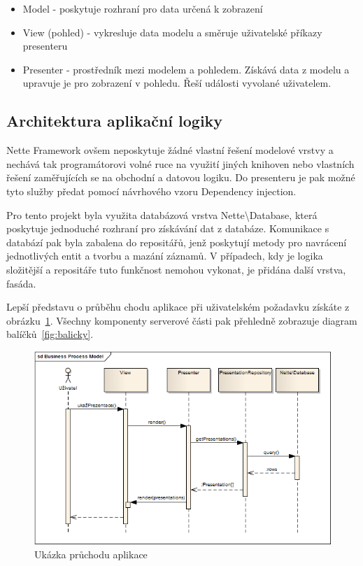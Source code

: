 \documentclass[11pt,twoside,a4paper]{book}
\begin{document}
\begin{itemize}
	\item Model - poskytuje rozhraní pro data určená k zobrazení
	\item View (pohled) - vykresluje data modelu a směruje uživatelské příkazy presenteru
	\item Presenter - prostředník mezi modelem a pohledem. Získává data z modelu a upravuje je pro zobrazení v pohledu. Řeší události vyvolané uživatelem.
\end{itemize}

\subsection{Architektura aplikační logiky}
Nette Framework ovšem neposkytuje žádné vlastní řešení modelové vrstvy a nechává tak programátorovi volné ruce na využití jiných knihoven nebo vlastních řešení zaměřujících se na obchodní a datovou logiku. Do presenteru je pak možné tyto služby předat pomocí návrhového vzoru Dependency injection\cite{di}.

Pro tento projekt byla využita databázová vrstva Nette\textbackslash{}Database, která poskytuje jednoduché rozhraní pro získávání dat z databáze. Komunikace s databází pak byla zabalena do repositářů, jenž poskytují metody pro navrácení jednotlivých entit a tvorbu a mazání záznamů. V případech, kdy je logika složitější a repositáře tuto funkčnost nemohou vykonat, je přidána další vrstva, fasáda. 

Lepší představu o průběhu chodu aplikace při uživatelském požadavku získáte z obrázku~\ref{fig:logika}. Všechny komponenty serverové části pak přehledně zobrazuje diagram balíčků~\ref{fig:balicky}.


\begin{figure}[ht]
	\begin{center}
		\includegraphics[width=14cm]{PRO-img/logika.png}
		\caption{Ukázka průchodu aplikace}
		\label{fig:logika}
	\end{center}
\end{figure}
\end{document}
